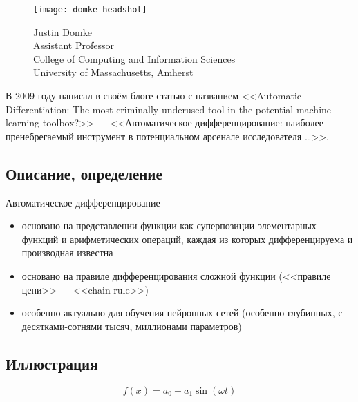 \documentclass{beamer}
\begin{document}
\begin{frame}{\secname}{\subsecname}
  \begin{figure}
	\texttt{[image: domke-headshot]}
	\caption{
	  Justin Domke \\
	  Assistant Professor \\
	  College of Computing and Information Sciences \\
	  University of Massachusetts, Amherst
	}
  \end{figure} \pause
	В 2009 году написал в своём блоге статью с названием \pause <<Automatic
	Differentiation: The most criminally underused tool in the potential machine
	learning toolbox?>>
  --- <<Автоматическое дифференцирование: наиболее пренебрегаемый
  инструмент в потенциальном арсенале исследователя \ldots>>.
\end{frame}


\subsection{Описание, определение}

\begin{frame}{\secname}{\subsecname}
  Автоматическое дифференцирование \pause
  \begin{itemize}
	\item основано на представлении функции как суперпозиции элементарных
	  функций и арифметических операций, каждая из которых дифференцируема и
	  производная известна \pause
	\item основано на правиле дифференцирования сложной функции (<<правиле
	  цепи>> --- <<chain-rule>>) \pause
	\item особенно актуально для обучения нейронных сетей (особенно глубинных, с
		десятками-сотнями тысяч, миллионами параметров)
  \end{itemize}
\end{frame}


\subsection{Иллюстрация}

\begin{frame}{\secname}{\subsecname}
	\[
		f(x) = a_0 + a_1 \sin (\omega t)
	\]
\end{frame}
\end{document}
